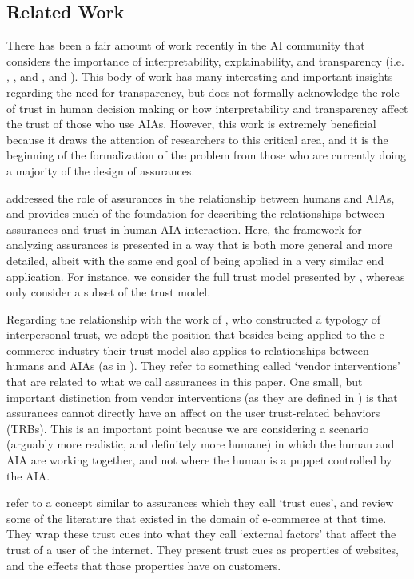 \subsection{Related Work}\label{sec:rel_work}
    There has been a fair amount of work recently in the AI community that considers the importance of interpretability, explainability, and transparency (i.e. \citet{Doshi-Velez2017-xy}, \citet{Weller2017-zx}, and \citet{Lipton2016-ug}, and \citet{Gunning2017-ih}). This body of work has many interesting and important insights regarding the need for transparency, but does not formally acknowledge the role of trust in human decision making or how interpretability and transparency affect the trust of those who use AIAs. However, this work is extremely beneficial because it draws the attention of researchers to this critical area, and it is the beginning of the formalization of the problem from those who are currently doing a majority of the design of assurances.

    \citet{Lillard2016-yg} addressed the role of assurances in the relationship between humans and AIAs, and provides much of the foundation for describing the relationships between assurances and trust in human-AIA interaction. Here, the framework for analyzing assurances is presented in a way that is both more general and more detailed, albeit with the same end goal of being applied in a very similar end application. For instance, we consider the full trust model presented by \citet{McKnight2001-fa}, whereas \citeauthor{Lillard2016-yg} only consider a subset of the trust model.

    Regarding the relationship with the work of \citet{McKnight2001-fa}, who constructed a typology of interpersonal trust, we adopt the position that besides being applied to the e-commerce industry their trust model also applies to relationships between humans and AIAs (as in \citet{Lillard2016-yg}). They refer to something called `vendor interventions' that are related to what we call assurances in this paper. One small, but important distinction from vendor interventions (as they are defined in \cite{McKnight2001-fa}) is that assurances cannot directly have an affect on the user trust-related behaviors (TRBs). This is an important point because we are considering a scenario (arguably more realistic, and definitely more humane) in which the human and AIA are working together, and not where the human is a puppet controlled by the AIA.

    \citet{Corritore2003-gx} refer to a concept similar to assurances which they call `trust cues', and review some of the literature that existed in the domain of e-commerce at that time. They wrap these trust cues into what they call `external factors' that affect the trust of a user of the internet. They present trust cues as properties of websites, and the effects that those properties have on customers.
    
